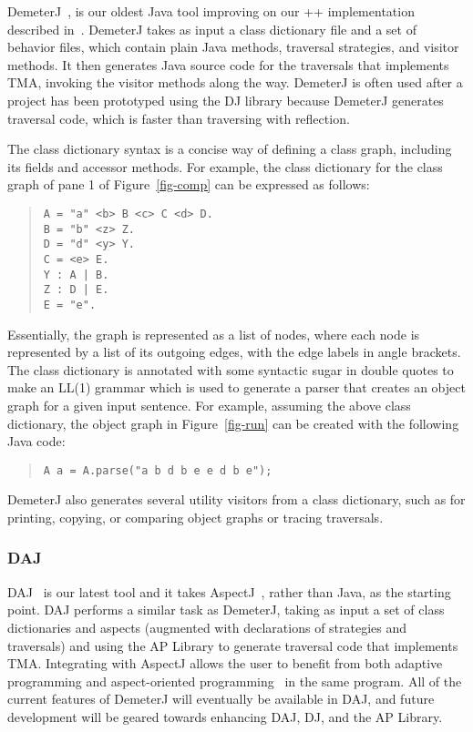 DemeterJ~\cite{cse:preventive}, is our oldest Java tool improving on
our \C++ implementation described in~\cite{karl:demeter}.  DemeterJ
takes as input a class dictionary file and a set of behavior files,
which contain plain Java methods, traversal strategies, and visitor
methods.  It then generates Java source code for the traversals that
implements TMA, invoking the visitor methods along the way.  DemeterJ
is often used after a project has been prototyped using the DJ library
because DemeterJ generates traversal code, which is faster than
traversing with reflection.

The class dictionary syntax is a concise way of defining a class
graph, including its fields and accessor methods.  For example, the
class dictionary for the class graph of pane 1 of
Figure~\ref{fig-comp} can be expressed as follows:
\begin{quote}
\begin{verbatim}
A = "a" <b> B <c> C <d> D.
B = "b" <z> Z.
D = "d" <y> Y.
C = <e> E.
Y : A | B.
Z : D | E.
E = "e".
\end{verbatim} 
\end{quote}
Essentially, the graph is represented as a list of nodes, where each
node is represented by a list of its outgoing edges, with the edge
labels in angle brackets.  The class dictionary is annotated with some
syntactic sugar in double quotes to make an LL(1) grammar which is
used to generate a parser that creates an object graph for a given
input sentence.  For example, assuming the above class dictionary, the
object graph in Figure~\ref{fig-run} can be created with the following
Java code:
\begin{quote}
\begin{verbatim}
A a = A.parse("a b d b e e d b e");
\end{verbatim}
\end{quote}

DemeterJ also generates several utility visitors from a class
dictionary, such as for printing, copying, or comparing object graphs
or tracing traversals.

\subsubsection{DAJ}

DAJ~\cite{URL:DAJ,sung:DAJ-02} is our latest tool and it takes
AspectJ~\cite{aop:ecoop2001}, rather than Java, as the starting point.
DAJ performs a similar task as DemeterJ, taking as input a set of
class dictionaries and aspects (augmented with declarations of
strategies and traversals) and using the AP Library to generate
traversal code that implements TMA.  Integrating with AspectJ allows
the user to benefit from both adaptive programming and aspect-oriented
programming~\cite{cacm-2001} in the same program.  All of the
current features of DemeterJ will eventually be available in DAJ, and
future development will be geared towards enhancing DAJ, DJ, and the
AP Library.

